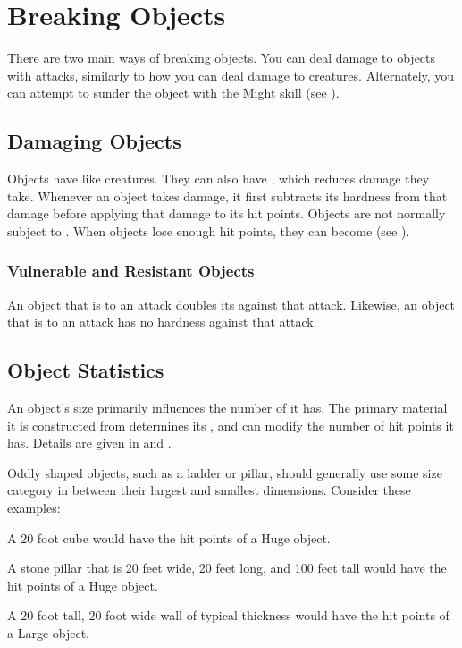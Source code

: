 \section{Breaking Objects}
  There are two main ways of breaking objects.
  You can deal damage to objects with attacks, similarly to how you can deal damage to creatures.
  Alternately, you can attempt to sunder the object with the Might skill (see ).

  \subsection{Damaging Objects}
    Objects have  like creatures.
    They can also have , which reduces damage they take.
    Whenever an object takes damage, it first subtracts its hardness from that damage before applying that damage to its hit points.
    Objects are not normally subject to .
    When objects lose enough hit points, they can become  (see ).

    \subsubsection{Vulnerable and Resistant Objects}
      An object that is \resistant to an attack doubles its  against that attack.
      Likewise, an object that is \vulnerable to an attack has no hardness against that attack.

  \subsection{Object Statistics}
    An object's size primarily influences the number of  it has.
    The primary material it is constructed from determines its , and can modify the number of hit points it has.
    Details are given in  and .

    Oddly shaped objects, such as a ladder or pillar, should generally use some size category in between their largest and smallest dimensions.
    Consider these examples:
    \begin{raggeditemize}
      \item A 20 foot cube would have the hit points of a Huge object.
      \item A stone pillar that is 20 feet wide, 20 feet long, and 100 feet tall would have the hit points of a Huge object.
      \item A 20 foot tall, 20 foot wide wall of typical thickness would have the hit points of a Large object.
    \end{raggeditemize}

